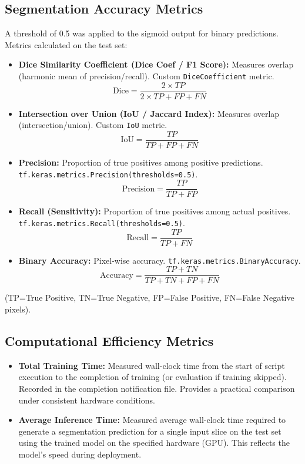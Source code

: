\subsection{Segmentation Accuracy Metrics}
A threshold of 0.5 was applied to the sigmoid output for binary predictions. Metrics calculated on the test set:
\begin{itemize}
  \item \textbf{Dice Similarity Coefficient (Dice Coef / F1 Score):} Measures overlap (harmonic mean of precision/recall). Custom \texttt{DiceCoefficient} metric.
    \begin{equation} \text{Dice} = \frac{2 \times TP}{2 \times TP + FP + FN}
    \end{equation}
  \item \textbf{Intersection over Union (IoU / Jaccard Index):} Measures overlap (intersection/union). Custom \texttt{IoU} metric.
    \begin{equation} \text{IoU} = \frac{TP}{TP + FP + FN}
    \end{equation}
  \item \textbf{Precision:} Proportion of true positives among positive predictions. \newline \texttt{tf.keras.metrics.Precision(thresholds=0.5)}.
    \begin{equation} \text{Precision} = \frac{TP}{TP + FP}
    \end{equation}
  \item \textbf{Recall (Sensitivity):} Proportion of true positives among actual positives. \newline \texttt{tf.keras.metrics.Recall(thresholds=0.5)}.
    \begin{equation} \text{Recall} = \frac{TP}{TP + FN}
    \end{equation}
  \item \textbf{Binary Accuracy:} Pixel-wise accuracy. \texttt{tf.keras.metrics.BinaryAccuracy}.
    \begin{equation} \text{Accuracy} = \frac{TP + TN}{TP + TN + FP + FN}
    \end{equation}
\end{itemize}
(TP=True Positive, TN=True Negative, FP=False Positive, FN=False Negative pixels).

\subsection{Computational Efficiency Metrics}
\begin{itemize}
  \item \textbf{Total Training Time:} Measured wall-clock time from the start of script execution to the completion of training (or evaluation if training skipped). Recorded in the completion notification file. Provides a practical comparison under consistent hardware conditions.
  \item \textbf{Average Inference Time:} Measured average wall-clock time required to generate a segmentation prediction for a single input slice on the test set using the trained model on the specified hardware (GPU). This reflects the model's speed during deployment.
\end{itemize}

